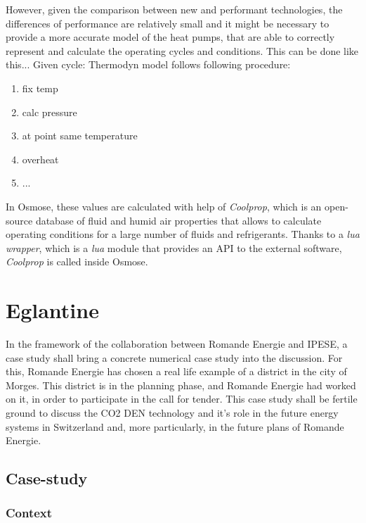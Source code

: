 \documentclass{article}
\begin{document}
However, given the comparison between new and performant technologies, the differences of performance are relatively small and it might be necessary to provide a more accurate model of the heat pumps, that are able to correctly represent and calculate the operating cycles and conditions. This can be done like this...
Given cycle:
Thermodyn model follows following procedure:
\begin{enumerate}
    \item fix temp
    \item calc pressure
    \item at point same temperature
    \item overheat
    \item ...
\end{enumerate}

In Osmose, these values are calculated with help of \textit{Coolprop}, which is an open-source database of fluid and humid air properties that allows to calculate operating conditions for a large number of fluids and refrigerants. Thanks to a \textit{lua wrapper}, which is a \textit{lua} module that provides an API to the external software, \textit{Coolprop} is called inside Osmose.

\section{Eglantine}
In the framework of the collaboration between Romande Energie and IPESE, a case study shall bring a concrete numerical case study into the discussion. For this, Romande Energie has chosen a real life example of a district in the city of Morges. This district is in the planning phase, and Romande Energie had worked on it, in order to participate in the call for tender. This case study shall be fertile ground to discuss the CO2 DEN technology and it's role in the future energy systems in Switzerland and, more particularly, in the future plans of Romande Energie.

\subsection{Case-study}
\subsubsection{Context}
\end{document}
